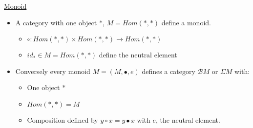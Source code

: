 \documentclass{article}
\theoremstyle{plain}
\begin{document}
    \ex \underline{Monoid}
    \begin{itemize}
      \item A category with one object $*$, $M = Hom(*, *)$ define a monoid.
        \begin{itemize}
          \item $\circ : Hom(*, *) \times Hom(*,*) \to Hom(*, *)$
          \item $id_* \in M = Hom(*, *)$ define the neutral element
        \end{itemize}
      \item Conversely every monoid $M = (M, \bullet, e)$ defines a category
        $\mathcal B M$ or $\Sigma M$ with:
        \begin{itemize}
          \item One object $*$
          \item $Hom(*, *) = M$
          \item Composition defined by $y \circ x = y \bullet x$ with $e$, the neutral
        element.

        \end{itemize}

      \begin{center}
      \end{center}
    \end{itemize}
\end{document}
